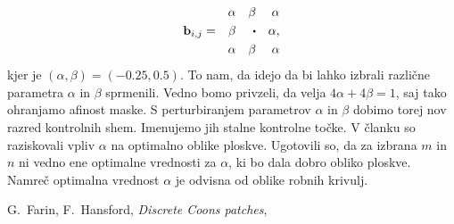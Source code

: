 \documentclass[a4paper,12pt]{article}
\begin{document}
\begin{align*}
   & &\alpha  & &\beta & &\alpha \\
&\mathbf{b}_{i,j}= & \beta & & \sbullet & & \alpha,\\
   & &\alpha & &\beta & &\alpha \\ 
\end{align*}
kjer je $(\alpha, \beta) = (-0.25, 0.5)$. To nam, da idejo da bi lahko izbrali različne 
parametra $\alpha$ in $\beta$ sprmenili. Vedno bomo privzeli, da velja $4\alpha + 4\beta = 1$, saj 
tako ohranjamo afinost maske. S perturbiranjem parametrov 
$\alpha$ in $\beta$ dobimo torej nov razred kontrolnih shem. 
Imenujemo jih stalne kontrolne točke. V članku \cite{članek1} so raziskovali
vpliv $\alpha$ na optimalno oblike ploskve. Ugotovili so, da za izbrana $m$ in $n$
ni vedno ene optimalne vrednosti za $\alpha$, ki bo dala dobro obliko ploskve.
Namreč optimalna vrednost $\alpha$ je odvisna od oblike robnih krivulj.

\newpage

\begin{thebibliography}{99}
   G.~Farin, F.~Hansford, \emph{Discrete Coons patches}, 
\end{thebibliography}
\end{document}
